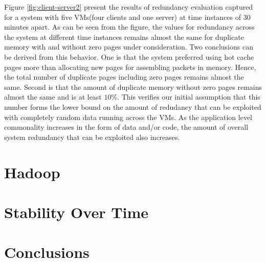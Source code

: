 \documentclass{acm_proc_article-sp}
\begin{document}
Figure \ref{fig:client-server2} present the results of redundancy evaluation captured for a system with five VMs(four clients and one server) at time instances of 30 minutes apart. As can be seen from the figure, the values for redundancy across the system at different time instances remains almost the same for duplicate memory with and without zero pages under consideration. Two conclusions can be derived from this behavior. One is that the system preferred using hot cache pages more than allocating new pages for assembling packets in memory. Hence, the total number of duplicate pages including zero pages remains almost the same. Second is that the amount of duplicate memory without zero pages remains almost the same and is at least $10$\%. This verifies our initial assumption that this number forms the lower bound on the amount of redudancy that can be exploited with completely random data running across the VMs. As the application level commonality increases in the form of data and/or code, the amount of overall system redundancy that can be exploited also increases.
\section{Hadoop}

\section{Stability Over Time}

\section{Conclusions}



\end{document}
